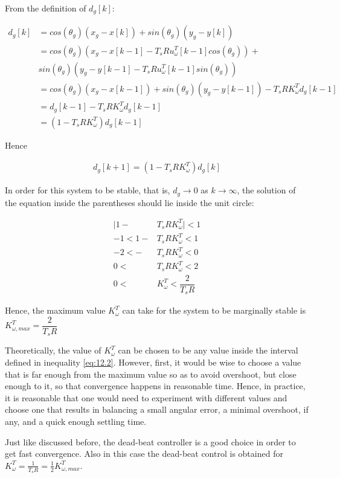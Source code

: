 From the definition of $d_g[k]$:

\begin{align*}
  d_g[k] &= cos(\theta_g) (x_g - x[k]) + sin(\theta_g) (y_g - y[k]) \\
         &= cos(\theta_g) (x_g - x[k-1] - T_s R u_{\omega}^T[k-1] cos(\theta_g)) + \\
         &  sin(\theta_g) (y_g - y[k-1] - T_s R u_{\omega}^T[k-1] sin(\theta_g)) \\
         &= cos(\theta_g) (x_g - x[k-1]) + sin(\theta_g) (y_g - y[k-1]) -T_s R K_{\omega}^T d_g[k-1]  \\
         &= d_g[k-1] - T_s R K_{\omega}^T d_g[k-1]  \\
         &= (1-T_s R K_{\omega}^T)d_g[k-1]
\end{align*}

Hence

\begin{align*}
  d_g[k+1]= (1-T_s R K_{\omega}^T)d_g[k]
\end{align*}

In order for this system to be stable, that is, $d_g \to 0$ as $k \to \infty$,
the solution of the equation inside the parentheses should lie inside the unit
circle:

\begin{align}
  \Big|1 - &T_s R K_{\omega}^T\Big| < 1 \nonumber \\
  -1 < 1 - &T_s R K_{\omega}^T < 1 \nonumber \\
  -2 < - &T_s R K_{\omega}^T < 0 \nonumber \\
   0 <\ &T_s R K_{\omega}^T < 2 \nonumber \\
   0 <\ &K_{\omega}^T < \dfrac{2}{T_s R} \label{eq:12.2}
\end{align}

Hence, the maximum value $K_{\omega}^T$ can take for the system to be marginally
stable is $K_{\omega,max}^T = \dfrac{2}{T_s R}$

Theoretically, the value of $K_{\omega}^T$ can be chosen to be any value inside
the interval defined in inequality \ref{eq:12.2}. However, first, it would be
wise to choose a value that is far enough from the maximum value so as to avoid
overshoot, but close enough to it, so that convergence happens in reasonable
time. Hence, in practice, it is reasonable that one would need to experiment
with different values and choose one that results in balancing a small angular
error, a minimal overshoot, if any, and a quick enough settling time.

Just like discussed before, the dead-beat controller is a good choice in order
to get fast convergence. Also in this case the dead-beat control is obtained for
$K_\omega ^T = \frac{1}{T_s R} = \frac{1}{2}K_{\omega,max} ^T$.
